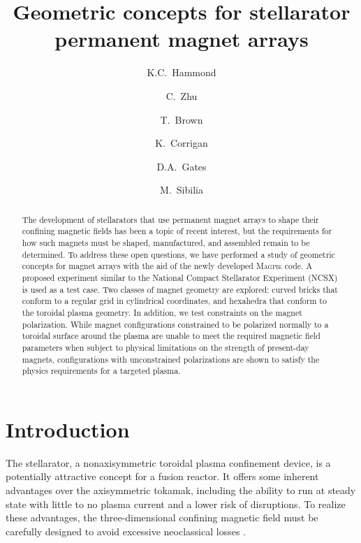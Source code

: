 \documentclass[11pt,onecolumn]{article}
\begin{document}
\title{Geometric concepts for stellarator permanent magnet arrays}

\author[1,*]{K.C.~Hammond}
\author[1]{C.~Zhu}
\author[1]{T.~Brown}
\author[1]{K.~Corrigan}
\author[1]{D.A.~Gates}
\author[1]{M.~Sibilia}

\maketitle

\begin{abstract}
The development of stellarators that use permanent magnet arrays to shape their 
confining magnetic fields has been a topic of recent interest, but the
requirements for how such magnets must be shaped, manufactured, and assembled
remain to be determined. To address these open questions, we
have performed a study of geometric concepts for magnet arrays with the aid
of the newly developed \textsc{Magpie} code. A proposed experiment similar
to the National Compact Stellarator Experiment (NCSX) is used
as a test case. Two classes of magnet geometry are explored: curved bricks that 
conform to a regular grid in cylindrical coordinates,
and hexahedra that conform to the toroidal plasma geometry. In addition, we
test constraints on the magnet polarization. While magnet configurations 
constrained to be polarized normally to a toroidal surface around the plasma
are unable to meet the required magnetic field parameters when subject to
physical limitations on the strength of present-day magnets, configurations
with unconstrained polarizations are shown to satisfy the physics requirements
for a targeted plasma.
\end{abstract}

\section{Introduction}
\label{sect:intro}

The stellarator, a nonaxisymmetric toroidal plasma confinement device, is
a potentially attractive concept for a fusion reactor.
It offers some inherent advantages over the axisymmetric tokamak, including
the ability to run at steady state with little to no plasma current
and a lower risk of disruptions. To realize these advantages, the 
three-dimensional confining magnetic field must be carefully designed to
avoid excessive neoclassical losses \cite{mynick2006a}. 
\end{document}
